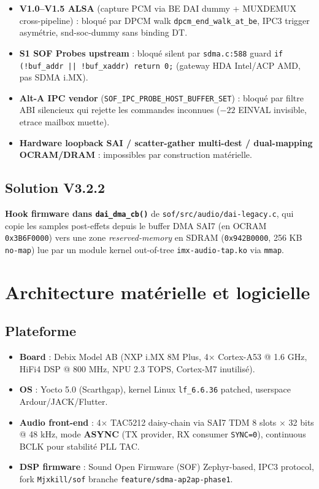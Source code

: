 \documentclass[11pt,a4paper]{article}
\begin{document}
\begin{itemize}[leftmargin=1.2em]
\item \textbf{V1.0--V1.5 ALSA} (capture PCM via BE DAI dummy + MUXDEMUX
  cross-pipeline) : bloqué par DPCM walk \texttt{dpcm\_end\_walk\_at\_be},
  IPC3 trigger asymétrie, snd-soc-dummy sans binding DT.
\item \textbf{S1 SOF Probes upstream} : bloqué silent par \texttt{sdma.c:588}
  guard \texttt{if (!buf\_addr || !buf\_xaddr) return 0;} (gateway HDA Intel/ACP
  AMD, pas SDMA i.MX).
\item \textbf{Alt-A IPC vendor} (\texttt{SOF\_IPC\_PROBE\_HOST\_BUFFER\_SET}) :
  bloqué par filtre ABI silencieux qui rejette les commandes inconnues
  ($-22$ EINVAL invisible, etrace mailbox muette).
\item \textbf{Hardware loopback SAI / scatter-gather multi-dest / dual-mapping
  OCRAM/DRAM} : impossibles par construction matérielle.
\end{itemize}

\subsection{Solution V3.2.2}

\textbf{Hook firmware dans \texttt{dai\_dma\_cb()}} de
\texttt{sof/src/audio/dai-legacy.c}, qui copie les samples post-effets depuis le
buffer DMA SAI7 (en OCRAM \texttt{0x3B6F0000}) vers une zone \emph{reserved-memory}
en SDRAM (\texttt{0x942B0000}, 256 KB \texttt{no-map}) lue par un module kernel
out-of-tree \texttt{imx-audio-tap.ko} via \texttt{mmap}.

\section{Architecture matérielle et logicielle}

\subsection{Plateforme}

\begin{itemize}[leftmargin=1.2em]
\item \textbf{Board} : Debix Model AB (NXP i.MX 8M Plus, 4× Cortex-A53 @ 1.6 GHz,
  HiFi4 DSP @ 800 MHz, NPU 2.3 TOPS, Cortex-M7 inutilisé).
\item \textbf{OS} : Yocto 5.0 (Scarthgap), kernel Linux \texttt{lf\_6.6.36}
  patched, userspace Ardour/JACK/Flutter.
\item \textbf{Audio front-end} : 4× TAC5212 daisy-chain via SAI7 TDM 8 slots
  $\times$ 32 bits @ 48 kHz, mode \textbf{ASYNC} (TX provider, RX consumer
  \texttt{SYNC=0}), continuous BCLK pour stabilité PLL TAC.
\item \textbf{DSP firmware} : Sound Open Firmware (SOF) Zephyr-based,
  IPC3 protocol, fork \texttt{Mjxkill/sof} branche
  \texttt{feature/sdma-ap2ap-phase1}.
\end{itemize}
\end{document}
